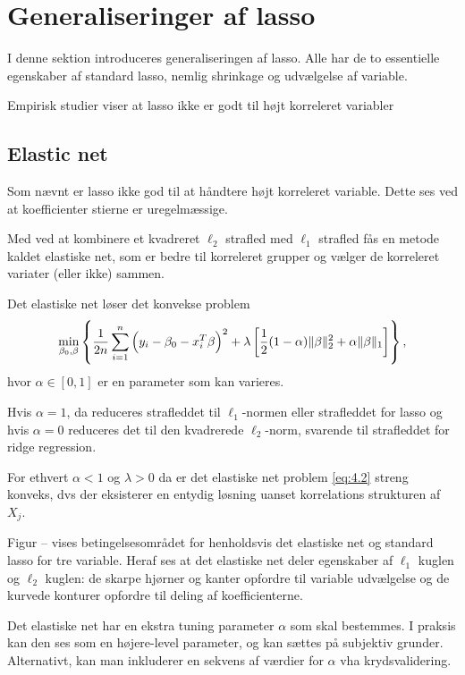 \section{Generaliseringer af lasso}
I denne sektion introduceres generaliseringen af lasso.
Alle har de to essentielle egenskaber af standard lasso, nemlig shrinkage og udvælgelse af variable.

Empirisk studier viser at lasso ikke er godt til højt korreleret variabler

\subsection{Elastic net}
Som nævnt er lasso ikke god til at håndtere højt korreleret variable. Dette ses ved at koefficienter stierne er uregelmæssige.


Med ved at kombinere et kvadreret $\ell_2$ strafled med $\ell_1$ strafled fås en metode kaldet elastiske net, som er bedre til korreleret grupper og vælger de korreleret variater (eller ikke) sammen.

Det elastiske net løser det konvekse problem
\begin{align}
\min_{\beta_0, \beta} \cbr{\frac{1}{2n} \sum_{i=1}^n \del{y_i - \beta_0 - x_{i}^T \beta}^2 + \lambda \sbr{\frac{1}{2} (1- \alpha) \Vert \beta \Vert_2^2 + \alpha \Vert \beta \Vert_1}}, \label{eq:4.2}
\end{align}
hvor $\alpha \in [0,1]$ er en parameter som kan varieres. 

Hvis $\alpha=1$, da reduceres strafleddet til $\ell_1$-normen eller strafleddet for lasso og hvis $\alpha=0$ reduceres det til den kvadrerede $\ell_2$-norm, svarende til strafleddet for ridge regression.

For ethvert $\alpha<1$ og $\lambda>0$ da er det elastiske net problem \eqref{eq:4.2} streng konveks, dvs der eksisterer en entydig løsning uanset korrelations strukturen af $X_j$.

Figur -- vises betingelsesområdet for henholdsvis det elastiske net og standard lasso for tre variable.
Heraf ses at det elastiske net deler egenskaber af $\ell_1$ kuglen og $\ell_2$ kuglen: de skarpe hjørner og kanter opfordre til variable udvælgelse og de kurvede konturer opfordre til deling af koefficienterne.
%

Det elastiske net har en ekstra tuning parameter $\alpha$ som skal bestemmes.
I praksis kan den ses som en højere-level parameter, og kan sættes på subjektiv grunder. Alternativt, kan man inkluderer en sekvens af værdier for $\alpha$ vha krydsvalidering.

